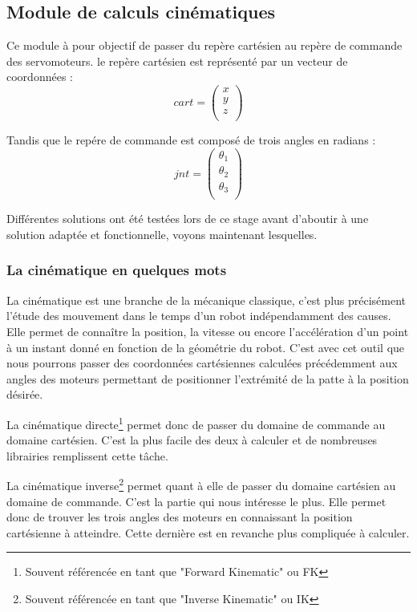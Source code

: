 \documentclass{tnreport}
\begin{document}
\newpage
\subsection{Module de calculs cinématiques}\label{lb:kinematics}
Ce module à pour objectif de passer du repère cartésien au repère de commande des servomoteurs. le repère cartésien est représenté par un vecteur de coordonnées : 
\begin{equation}
cart= 
    \begin{pmatrix}
    x \\
    y \\
    z \\
\end{pmatrix}
\end{equation}

Tandis que le repére de commande est composé de trois angles en radians :
\begin{equation}
    jnt= 
    \begin{pmatrix}
    \theta_1 \\
    \theta_2 \\
    \theta_3 \\
\end{pmatrix}
\end{equation}

Différentes solutions ont été testées lors de ce stage avant d'aboutir à une solution adaptée et fonctionnelle, voyons maintenant lesquelles.
\subsubsection{La cinématique en quelques mots}
La cinématique est une branche de la mécanique classique, c'est plus précisément l'étude des mouvement dans le temps d'un robot indépendamment des causes. Elle permet de connaître la position, la vitesse ou encore l'accélération d'un point à un instant donné en fonction de la géométrie du robot. C'est avec cet outil que nous pourrons passer des coordonnées cartésiennes calculées précédemment aux angles des moteurs permettant de positionner l'extrémité de la patte à la position désirée. 

La cinématique directe\footnote{Souvent référencée en tant que "Forward Kinematic" ou FK} permet donc de passer du domaine de commande au domaine cartésien. C'est la plus facile des deux à calculer et de nombreuses librairies remplissent cette tâche. 

La cinématique inverse\footnote{Souvent référencée en tant que "Inverse Kinematic" ou IK} permet quant à elle de passer du domaine cartésien au domaine de commande. C'est la partie qui nous intéresse le plus. Elle permet donc de trouver les trois angles des moteurs en connaissant la position cartésienne à atteindre. Cette dernière est en revanche plus compliquée à calculer. 
\end{document}
